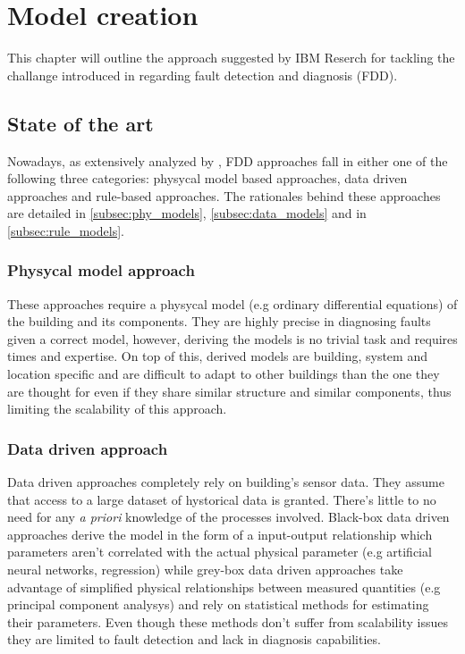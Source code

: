 \chapter{Model creation} \label{ch:model}
This chapter will outline the approach suggested by IBM Reserch for tackling the challange introduced in \textbf{} regarding fault detection and diagnosis (FDD).

\section{State of the art}
Nowadays, as extensively analyzed by \textcite{methods_for_diagnostic}, FDD approaches fall in either one of the following three categories: physycal model based approaches, data driven approaches and rule-based approaches. The rationales behind these approaches are detailed in \autoref{subsec:phy_models}, \autoref{subsec:data_models} and in \autoref{subsec:rule_models}.

\subsection{Physycal model approach} \label{subsec:phy_models}
These approaches require a physycal model (e.g ordinary differential equations) of the building and its components. They are highly precise in diagnosing faults given a correct model, however, deriving the models is no trivial task and requires times and expertise. On top of this, derived models are building, system and location specific and are difficult to adapt to other buildings than the one they are thought for even if they share similar structure and similar components, thus limiting the scalability of this approach.

\subsection{Data driven approach} \label{subsec:data_models}
Data driven approaches completely rely on building's sensor data. They assume that access to a large dataset of hystorical data is granted. There's little to no need for any \textit{a priori} knowledge of the processes involved. Black-box data driven approaches derive the model in the form of a input-output relationship which parameters aren't correlated with the actual physical parameter (e.g artificial neural networks, regression) while grey-box data driven approaches take advantage of simplified physical relationships between measured quantities (e.g principal component analysys) and rely on statistical methods for estimating their parameters. Even though these methods don't suffer from scalability issues they are limited to fault detection and lack in diagnosis capabilities.


